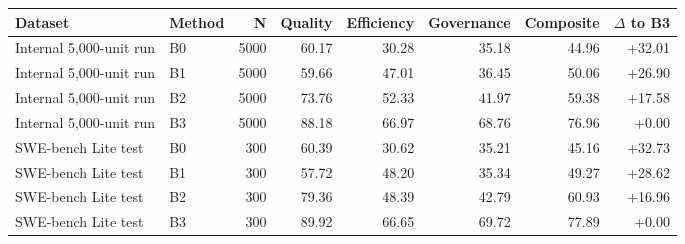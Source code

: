 \begin{tabular}{llrrrrrr}
\hline
Dataset & Method & N & Quality & Efficiency & Governance & Composite & $\Delta$ to B3 \\
\hline
Internal 5,000-unit run & B0 & 5000 & 60.17 & 30.28 & 35.18 & 44.96 & +32.01 \\
Internal 5,000-unit run & B1 & 5000 & 59.66 & 47.01 & 36.45 & 50.06 & +26.90 \\
Internal 5,000-unit run & B2 & 5000 & 73.76 & 52.33 & 41.97 & 59.38 & +17.58 \\
Internal 5,000-unit run & B3 & 5000 & 88.18 & 66.97 & 68.76 & 76.96 & +0.00 \\
SWE-bench Lite test & B0 & 300 & 60.39 & 30.62 & 35.21 & 45.16 & +32.73 \\
SWE-bench Lite test & B1 & 300 & 57.72 & 48.20 & 35.34 & 49.27 & +28.62 \\
SWE-bench Lite test & B2 & 300 & 79.36 & 48.39 & 42.79 & 60.93 & +16.96 \\
SWE-bench Lite test & B3 & 300 & 89.92 & 66.65 & 69.72 & 77.89 & +0.00 \\
\hline
\end{tabular}

